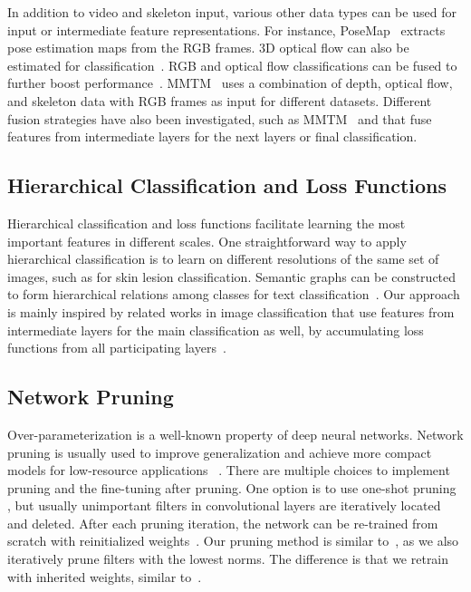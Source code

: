 \documentclass{article}
\begin{document}
{In addition to video and skeleton input, various other data types can be used for input or intermediate feature representations. For instance,  PoseMap~\cite{Liu2018Recognizing} extracts pose estimation maps from the RGB frames. 3D optical flow can also be estimated for classification~\cite{Ballin_3DFlowEstimation}. RGB and optical flow classifications can be fused to further boost performance~\cite{Simonyan_two-stream}. MMTM~\cite{joze2019mmtm} uses a combination of depth, optical flow, and skeleton data with RGB frames as input for different datasets. Different fusion strategies have also been investigated, such as MMTM~\cite{joze2019mmtm} and \cite{Perez_Rua_2019} that fuse features from intermediate layers for the next layers or final classification.}









\subsection{Hierarchical Classification and Loss Functions}
{Hierarchical classification and loss functions facilitate learning the most important features in different scales. One straightforward way to apply hierarchical classification is to learn on different resolutions of the same set of images, such as \cite{Kawahara2016MultiresolutionTractCW} for skin lesion classification. Semantic graphs can be constructed to form hierarchical relations among classes for text classification~\cite{Wu_2019}. Our approach is mainly inspired by related works in image classification that use features from intermediate layers for the main classification as well, by accumulating loss functions from all participating layers~\cite{Szegedy_2015_CVPR,huang2018multiscale}.}

\subsection{Network Pruning}
{Over-parameterization is a well-known property of deep neural networks. Network pruning is usually used to improve generalization and achieve more compact models for low-resource applications ~\cite{frankle2018lottery,liu2018rethinking}. There are multiple choices to implement pruning and the fine-tuning after pruning. One option is to use one-shot pruning \cite{li2016pruning}, but usually unimportant filters in convolutional layers are iteratively located and deleted. After each pruning iteration, the network can be re-trained from scratch with reinitialized weights~\cite{frankle2018lottery,liu2018rethinking}. Our pruning method is similar to~\cite{frankle2018lottery}, as we also iteratively prune filters with the lowest  norms. The difference is that we retrain with inherited weights, similar to~\cite{li2016pruning}.}
\end{document}
